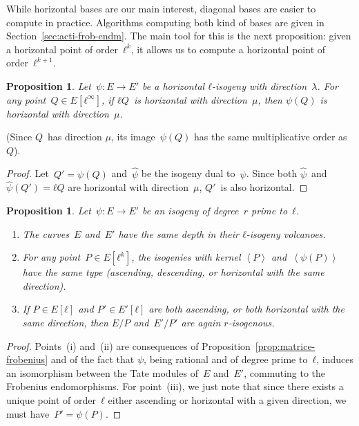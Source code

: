 \documentclass{lms}
\newtheorem{prop}[thm]{Proposition}
\def\chev#1{\left\langle#1\right\rangle}
\begin{document}
While horizontal bases are our main interest,
diagonal bases are easier to compute in practice.
Algorithms computing both kind of bases
are given in Section~\ref{sec:acti-frob-endm}.
The main tool for this is the next proposition:
given a horizontal point of order~$ℓ^k$,
it allows us to compute a horizontal point of order~$ℓ^{k+1}$.

\begin{prop}\label{prop:push-horizontal}
Let~$ψ: E → E'$ be a horizontal $ℓ$-isogeny with direction~$λ$.
For any point~$Q ∈ E[ℓ^∞]$,
if $ℓ Q$~is horizontal with direction~$μ$,
then $ψ(Q)$ is horizontal with direction~$μ$.
\end{prop}
(Since $Q$~has direction $μ$,
its image~$ψ(Q)$ has the same multiplicative order as~$Q$).
\begin{proof}
Let~$Q' = ψ(Q)$ and~$\widehat{ψ}$ be the isogeny dual to~$ψ$.
Since both $\widehat{ψ}$~and~$\widehat{ψ}(Q') = ℓ Q$ are horizontal
with direction~$μ$, $Q'$~is also horizontal.
\end{proof}
\begin{prop}\label{prop:parallel}
Let~$ψ: E → E'$ be an isogeny of degree~$r$ prime to~$ℓ$.
\begin{enumerate}
\item The curves~$E$ and~$E'$ have the same depth
in their $ℓ$-isogeny volcanoes.
\item\label{prop:parallel:func} For any point~$P ∈ E[ℓ^k]$,
the isogenies with kernel $\chev{P}$ and~$\chev{ψ(P)}$ have the same type
(ascending, descending, or horizontal with the same direction).
\item\label{prop:parallel:ascent} If $P ∈ E[ℓ]$ and $P' ∈ E'[ℓ]$ are both ascending,
or both horizontal with the same direction,
then $E/P$ and~$E'/P'$ are again $r$-isogenous.
\end{enumerate}
\end{prop}
\begin{proof}
Points~(i) and~(ii) are consequences of Proposition~\ref{prop:matrice-frobenius}
and of the fact that $ψ$, being rational and of degree prime to~$ℓ$,
induces an isomorphism between the Tate modules of~$E$ and~$E'$,
commuting to the Frobenius endomorphisms.
For point~(iii), we just note that
since there exists a unique point of order~$ℓ$
either ascending or horizontal with a given direction,
we must have~$P' = ψ(P)$.
\end{proof}

\end{document}
